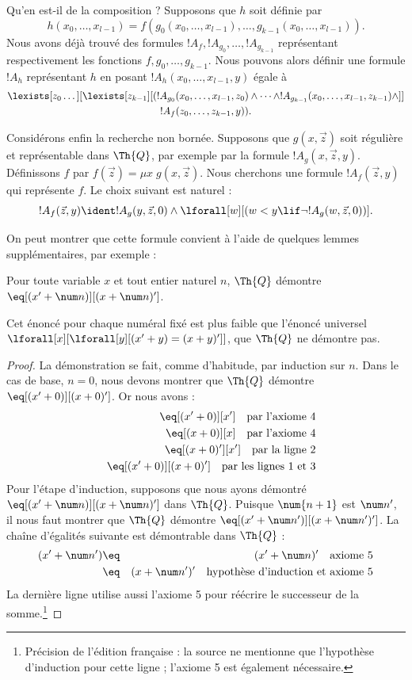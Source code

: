 \documentclass[../../../include/open-logic-section]{subfiles}
\begin{document}
Qu'en est-il de la composition ? Supposons que $h$ soit
définie par
\[
h(x_0,\dots,x_{l-1}) = f(g_0(x_0,\dots,x_{l-1}), \dots,
g_{k-1}(x_0,\dots,x_{l-1})).
\]
Nous avons déjà trouvé des formules
$!A_f, !A_{g_0}, \dots, !A_{g_{k-1}}$ représentant
respectivement les fonctions $f,g_0,\dots,g_{k-1}$.
Nous pouvons alors définir une formule $!A_h$ représentant
$h$ en posant $!A_h(x_0,\dots,x_{l-1},y)$ égale à
\begin{multline*}
  \lexists[z_0\dots][\lexists[z_{k-1}][(!A_{g_0}(x_0,\dots,x_{l-1},z_0) \land
  \dots \land !A_{g_{k-1}}(x_0,\dots,x_{l-1},z_{k-1}) \land]]\\
  !A_f(z_0,\dots,z_{k-1},y)).
\end{multline*}

Considérons enfin la recherche non bornée.
Supposons que $g(x,\vec z)$ soit régulière et représentable
dans $\Th{Q}$, par exemple par la formule
$!A_g(x,\vec z,y)$. Définissons $f$ par
$f(\vec z)=\mu x\;g(x,\vec z)$.
Nous cherchons une formule $!A_f(\vec z,y)$ qui représente
$f$. Le choix suivant est naturel :
\[
!A_f(\vec z,y) \ident !A_g(y,\vec z,0) \land \lforall[w][(w < y
\lif \lnot !A_g(w,\vec z,0))].
\]

On peut montrer que cette formule convient à l'aide de
quelques lemmes supplémentaires, par exemple :

\begin{lem}
Pour toute variable $x$ et tout entier naturel $n$,
$\Th{Q}$ démontre $\eq[(x'+\num n)][(x+\num n)']$.
\end{lem}

Cet énoncé pour chaque numéral fixé est plus faible que
l'énoncé universel
$\lforall[x][\lforall[y][(x'+y)=(x+y)']]$,
que $\Th{Q}$ ne démontre pas.

\begin{proof}
La démonstration se fait, comme d'habitude, par induction
sur $n$. Dans le cas de base, $n=0$, nous devons montrer
que $\Th{Q}$ démontre $\eq[(x'+0)][(x+0)']$.
Or nous avons :
\begin{eqnarray*}
& & \eq[(x' + 0)][x'] \quad \text{par l'axiome 4} \\
& & \eq[(x + 0)][x] \quad \text{par l'axiome 4} \\
& & \eq[(x+0)'][x'] \quad \text{par la ligne 2} \\
& & \eq[(x' + 0)][(x + 0)'] \quad \text{par les lignes 1 et 3}
\end{eqnarray*}
Pour l'étape d'induction, supposons que nous ayons démontré
$\eq[(x'+\num n)][(x+\num n)']$ dans $\Th{Q}$.
Puisque $\num{n+1}$ est $\num n'$, il nous faut montrer
que $\Th{Q}$ démontre
$\eq[(x'+\num n')][(x+\num n')']$.
La chaîne d'égalités suivante est démontrable dans $\Th{Q}$ :
\begin{eqnarray*}
(x' + \num n') & \eq & (x' + \num n)' \quad \text{axiome 5} \\
& \eq & (x + \num n')' \quad \text{hypothèse d'induction et axiome 5}
\end{eqnarray*}
La dernière ligne utilise aussi l'axiome 5 pour réécrire
le successeur de la somme.\footnote{Précision de l'édition
française : la source ne mentionne que l'hypothèse
d'induction pour cette ligne ; l'axiome 5 est également
nécessaire.}
\end{proof}
\end{document}
